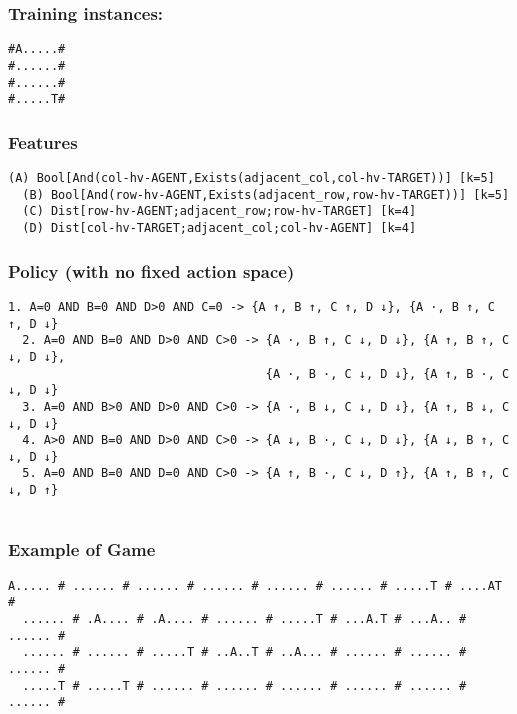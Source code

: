 \documentclass[a4paper]{article}
\begin{document}
\subsubsection{Training instances:}
\begin{Verbatim}[fontsize=\footnotesize]
#A.....#
#......#
#......#
#.....T#
\end{Verbatim}

\subsubsection{Features}
\begin{Verbatim}[fontsize=\footnotesize]
  (A) Bool[And(col-hv-AGENT,Exists(adjacent_col,col-hv-TARGET))] [k=5]
  (B) Bool[And(row-hv-AGENT,Exists(adjacent_row,row-hv-TARGET))] [k=5]
  (C) Dist[row-hv-AGENT;adjacent_row;row-hv-TARGET] [k=4]
  (D) Dist[col-hv-TARGET;adjacent_col;col-hv-AGENT] [k=4]
\end{Verbatim}

\subsubsection{Policy (with no fixed action space)}

\begin{Verbatim}[fontsize=\footnotesize]
  1. A=0 AND B=0 AND D>0 AND C=0 -> {A ↑, B ↑, C ↑, D ↓}, {A ·, B ↑, C ↑, D ↓}
  2. A=0 AND B=0 AND D>0 AND C>0 -> {A ·, B ↑, C ↓, D ↓}, {A ↑, B ↑, C ↓, D ↓},
                                    {A ·, B ·, C ↓, D ↓}, {A ↑, B ·, C ↓, D ↓}
  3. A=0 AND B>0 AND D>0 AND C>0 -> {A ·, B ↓, C ↓, D ↓}, {A ↑, B ↓, C ↓, D ↓}
  4. A>0 AND B=0 AND D>0 AND C>0 -> {A ↓, B ·, C ↓, D ↓}, {A ↓, B ↑, C ↓, D ↓}
  5. A=0 AND B=0 AND D=0 AND C>0 -> {A ↑, B ·, C ↓, D ↑}, {A ↑, B ↑, C ↓, D ↑}


\end{Verbatim}

\subsubsection{Example of Game}
\begin{Verbatim}[fontsize=\footnotesize]
  A..... # ...... # ...... # ...... # ...... # ...... # .....T # ....AT #
  ...... # .A.... # .A.... # ...... # .....T # ...A.T # ...A.. # ...... #
  ...... # ...... # .....T # ..A..T # ..A... # ...... # ...... # ...... #
  .....T # .....T # ...... # ...... # ...... # ...... # ...... # ...... #
\end{Verbatim}
\end{document}
